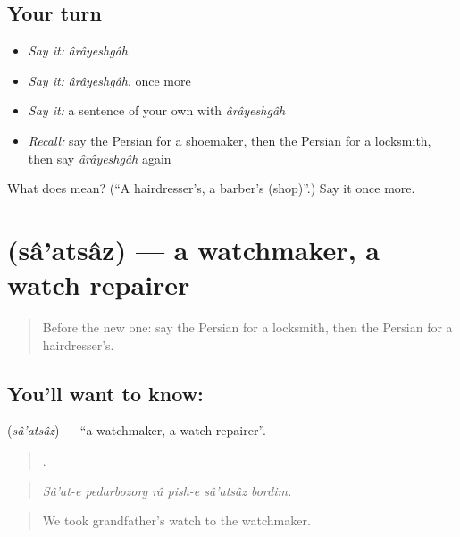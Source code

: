 \subsection*{Your turn}
\begin{itemize}
\raggedright
  \item \emph{Say it:} \emph{ârâyeshgâh}
  \item \emph{Say it:} \emph{ârâyeshgâh}, once more
  \item \emph{Say it:} a sentence of your own with \emph{ârâyeshgâh}
  \item \emph{Recall:} say the Persian for a shoemaker, then the Persian for a locksmith, then say \emph{ârâyeshgâh} again
\end{itemize}

\begin{tcolorbox}[breakable,colback=teal!4,colframe=teal!35!black,title={Before you move on}]
What does  mean? (\textquotedblleft{}A hairdresser's, a barber's (shop)\textquotedblright{}.) Say it once more.
\end{tcolorbox}
\section[\texorpdfstring{\fa{ساعت} \fa{ساز} (sâ'atsâz)}{ساعت ساز (sâ'atsâz)}]{  (sâ'atsâz) — a watchmaker, a watch repairer}

\label{lesson:FA-C454-saatsaz}



\begin{quote}
Before the new one: say the Persian for a locksmith, then the Persian for a hairdresser's.
\end{quote}

\subsection*{You'll want to know:  }
\textbf{ } (\emph{sâ'atsâz}) — \textquotedblleft{}a watchmaker, a watch repairer\textquotedblright{}.

\begin{quote}
      .
\end{quote}

\begin{quote}
\emph{Sâ'at-e pedarbozorg râ pish-e sâ'atsâz bordim.}
\end{quote}

\begin{quote}
We took grandfather's watch to the watchmaker.
\end{quote}

